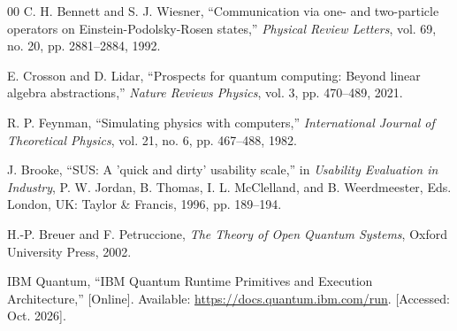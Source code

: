 \documentclass[conference]{IEEEtran}
\begin{document}
\begin{thebibliography}{00}
 C. H. Bennett and S. J. Wiesner, ``Communication via one- and two-particle operators on Einstein-Podolsky-Rosen states,'' \emph{Physical Review Letters}, vol. 69, no. 20, pp. 2881--2884, 1992.

 E. Crosson and D. Lidar, ``Prospects for quantum computing: Beyond linear algebra abstractions,'' \emph{Nature Reviews Physics}, vol. 3, pp. 470--489, 2021.

 R. P. Feynman, ``Simulating physics with computers,'' \emph{International Journal of Theoretical Physics}, vol. 21, no. 6, pp. 467--488, 1982.

 J. Brooke, ``SUS: A 'quick and dirty' usability scale,'' in \emph{Usability Evaluation in Industry}, P. W. Jordan, B. Thomas, I. L. McClelland, and B. Weerdmeester, Eds. London, UK: Taylor \& Francis, 1996, pp. 189--194.

 H.-P. Breuer and F. Petruccione, \emph{The Theory of Open Quantum Systems}, Oxford University Press, 2002.

 IBM Quantum, ``IBM Quantum Runtime Primitives and Execution Architecture,'' [Online]. Available: \url{https://docs.quantum.ibm.com/run}. [Accessed: Oct. 2026].

\end{thebibliography}
\end{document}
